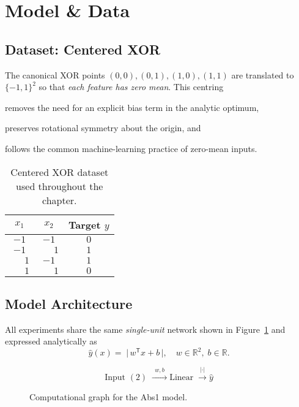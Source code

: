﻿%
\section{Model \& Data}
\label{sec:abs1-model-data}

\subsection*{Dataset: Centered XOR}
The canonical XOR points \((0,0),(0,1),(1,0),(1,1)\) are translated to
\(\{-1,1\}^2\) so that \emph{each feature has zero mean}.  
This centring

\begin{enumerate*}[label=(\roman*)]
  \item removes the need for an explicit bias term in the analytic optimum,
  \item preserves rotational symmetry about the origin, and
  \item follows the common machine-learning practice of zero-mean inputs.
\end{enumerate*}

\begin{table}[h]
\centering
\caption{Centered XOR dataset used throughout the chapter.}
\label{tab:xor-data}
\begin{tabular}{@{}cc|c@{}}\toprule
$x_1$ & $x_2$ & Target $y$ \\ \midrule
$-1$ & $-1$ & $0$ \\
$-1$ & $\;\phantom{-}1$ & $1$ \\
$\;\phantom{-}1$ & $-1$ & $1$ \\
$\;\phantom{-}1$ & $\;\phantom{-}1$ & $0$ \\ \bottomrule
\end{tabular}
\end{table}

\subsection*{Model Architecture}
All experiments share the same \emph{single-unit} network shown in
Figure~\ref{fig:model-graph} and expressed analytically as
\begin{equation}
    \hat y(x)
    =\;
    \bigl\lvert\,w^{\mathsf T}x + b\,\bigr\rvert,
    \quad
    w \in \mathbb{R}^{2},\;
    b \in \mathbb{R}.
    \label{eq:abs1}
\end{equation}

\begin{figure}[h]
\centering
\[
    \text{Input }(2)
    \;\xrightarrow{\;\,w,b\,\;}
    \text{Linear}
    \;\xrightarrow{\;|\cdot|\;}
    \hat y
\]
\caption{Computational graph for the Abs1 model.}
\label{fig:model-graph}
\end{figure}

